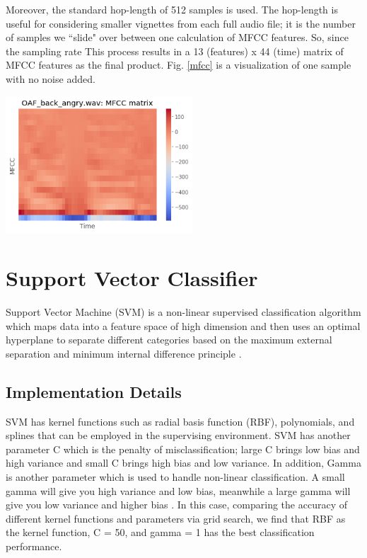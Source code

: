 \documentclass[12pt]{article}
\begin{document}
\begin{multicols*}{2}
Moreover, the standard hop-length of 512 samples is used.
The hop-length is useful for considering smaller vignettes from each full audio file; it is the number of samples we ``slide" over between one calculation of MFCC features.
So, since the sampling rate
This process results in a 13 (features) x 44 (time) matrix of MFCC features as the final product.
Fig. \ref{mfcc} is a visualization of one sample with no noise added.

{
    \centering
    \includegraphics[width=2.75in]{figures/mfcc.png}
    \label{mfcc}
}

\section*{Support Vector Classifier}
Support Vector Machine (SVM) is a non-linear supervised classification algorithm which maps data into a feature space of high dimension and then uses an optimal hyperplane to separate different categories based on the maximum external separation and minimum internal difference principle \cite{suykens1999least}.

\subsection*{Implementation Details}
SVM has kernel functions such as radial basis function (RBF), polynomials, and splines that can be employed in the supervising environment. SVM has another parameter C which is the penalty of misclassification; large C brings low bias and high variance and small C brings high bias and low variance. In addition, Gamma is another parameter which is used to handle non-linear classification. A small gamma will give you high variance and low bias, meanwhile a large gamma will give you low variance and higher bias \cite{min2005bankruptcy}. In this case, comparing the accuracy of different kernel functions and parameters via grid search, we find that RBF as the kernel function, C = 50, and gamma = 1 has the best classification performance.


\end{multicols*}
\end{document}
